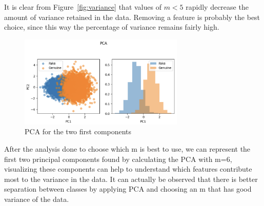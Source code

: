 \documentclass{article}
\begin{document}
It is clear from Figure~\ref{fig:variance} that values of \( m<5\) rapidly decrease the amount of variance retained in the data. Removing a feature is probably the best choice, since this way the percentage of variance remains fairly high.
\begin{figure}[H]
    \centering
    \includegraphics[width=0.7\textwidth]{./img/PCA.png}
    \caption{PCA for the two first components}
    \label{fig:PCA}
\end{figure} 

After the analysis done to choose which m is best to use, we can represent the first two principal components found by calculating the PCA with m=6, visualizing these components can help to understand which features contribute most to the variance in the data.
It can actually be observed that there is better separation between classes by applying PCA and choosing an m that has good variance of the data.
\end{document}

